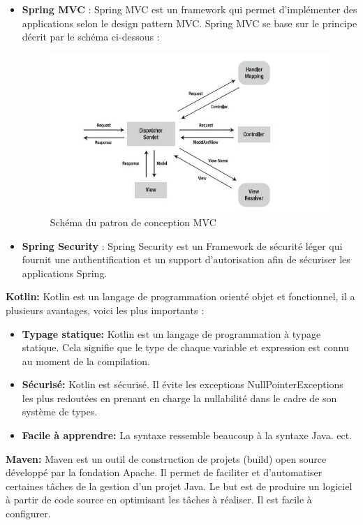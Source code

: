 \documentclass[12pt]{article}
\begin{document}
\begin{itemize}
	\item \textbf{Spring MVC} : Spring MVC est un framework qui permet d’implémenter des applications selon le design pattern MVC. Spring MVC se base sur le principe décrit par le schéma ci-dessous :\newline
	

\begin{figure}[H]
	\centering
 		\includegraphics[width=1\textwidth]{diagrammes/mvc2.jpg} 
  		\caption{Schéma du patron de conception MVC}
	\end{figure}
	
	\item \textbf{Spring Security }: Spring Security est un Framework de sécurité léger qui fournit une authentification et un support d’autorisation afin de sécuriser les applications Spring. \newline
\end{itemize} 

\textbf{Kotlin:} Kotlin est un langage de programmation orienté objet et fonctionnel, il a plusieurs avantages, voici les plus importants :
\begin{itemize}
\item \textbf{Typage statique: } Kotlin est un langage de programmation à typage statique. Cela signifie que le type de chaque variable et expression est connu au moment de la compilation.
\item \textbf{Sécurisé: } Kotlin est sécurisé. Il évite les exceptions NullPointerExceptions les plus redoutées en prenant en charge la nullabilité dans le cadre de son système de types.
\item \textbf{Facile à apprendre: } La syntaxe ressemble beaucoup à la syntaxe Java.
ect.
\end{itemize} 
\textbf{Maven:} Maven est un outil de construction de projets (build) open source développé par la fondation Apache. Il permet de faciliter et d'automatiser certaines tâches de la gestion d'un projet Java. Le but est de produire un logiciel à partir de code source en optimisant les tâches à réaliser. Il est facile à configurer.\newline
\end{document}
